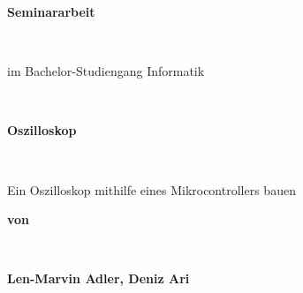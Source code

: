 \begin{titlepage}
\begin{Large}
\begin{flushleft}
\end{flushleft} 
\end{Large}

\vspace{0.150\textheight}
\begin{center}
 \begin{Huge} \textbf{Seminararbeit} \end{Huge}\\
 \vspace{2em}
 \begin{Large} im Bachelor-Studiengang Informatik \end{Large}
 \vspace{0.10\textheight}\\
 \begin{Huge} \textbf{Oszilloskop} \end{Huge}\\
 \vspace{1em}
 \begin{Large}Ein Oszilloskop mithilfe eines Mikrocontrollers bauen\end{Large}

 \vspace{2em}
 \begin{Large}\textbf{von} \end{Large}\\
 \vspace{1em}
 \begin{Large}\textbf{Len-Marvin Adler, Deniz Ari}\end{Large}\\
\end{center}
\vspace{0.100\textheight}


\end{titlepage}
